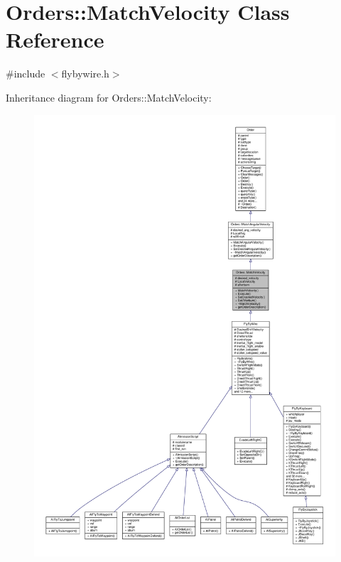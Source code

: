 \hypertarget{classOrders_1_1MatchVelocity}{}\section{Orders\+:\+:Match\+Velocity Class Reference}
\label{classOrders_1_1MatchVelocity}


{\ttfamily \#include $<$flybywire.\+h$>$}



Inheritance diagram for Orders\+:\+:Match\+Velocity\+:
\nopagebreak
\begin{figure}[H]
\begin{center}
\leavevmode
\includegraphics[width=350pt]{d2/d1a/classOrders_1_1MatchVelocity__inherit__graph}
\end{center}
\end{figure}


